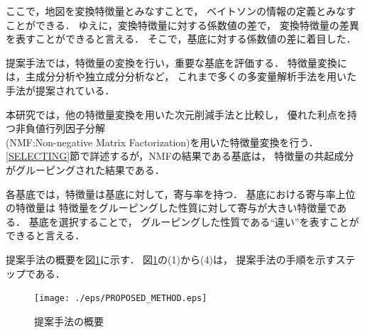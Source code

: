 \documentclass[12pt,a4paper,twocolumn,twoside]{jsik}
\begin{document}
ここで，地図を変換特徴量とみなすことで，
ベイトソンの情報の定義とみなすことができる．
ゆえに，変換特徴量に対する係数値の差で，
変換特徴量の差異を表すことができると言える．
そこで，基底に対する係数値の差に着目した．

提案手法では，特徴量の変換を行い，重要な基底を評価する．
特徴量変換には，主成分分析や独立成分分析など，
これまで多くの多変量解析手法を用いた手法が提案されている．

本研究では，他の特徴量変換を用いた次元削減手法と比較し，
優れた利点を持つ非負値行列因子分解\\
(NMF:Non-negative Matrix Factorization)を用いた特徴量変換を行う\cite{nmf}\cite{text_data_analysis_nmf}．
%
%
\ref{SELECTING}節で詳述するが，NMFの結果である基底は，
特徴量の共起成分がグルーピングされた結果である\cite{nmf}．

\newpage
各基底では，特徴量は基底に対して，寄与率を持つ．
基底における寄与率上位の特徴量は
特徴量をグルーピングした性質に対して寄与が大きい特徴量である．
%
基底を選択することで，
グルーピングした性質である``違い''を表すことができると言える．

提案手法の概要を図\ref{fig:proposed_method}に示す．
図\ref{fig:proposed_method}の(1)から(4)は，
提案手法の手順を示すステップである．
%
\begin{figure}[htb]
  \begin{center}
    \texttt{[image: ./eps/PROPOSED\_METHOD.eps]}
    \caption{提案手法の概要}
    \label{fig:proposed_method}
  \end{center}
\end{figure}
\end{document}
